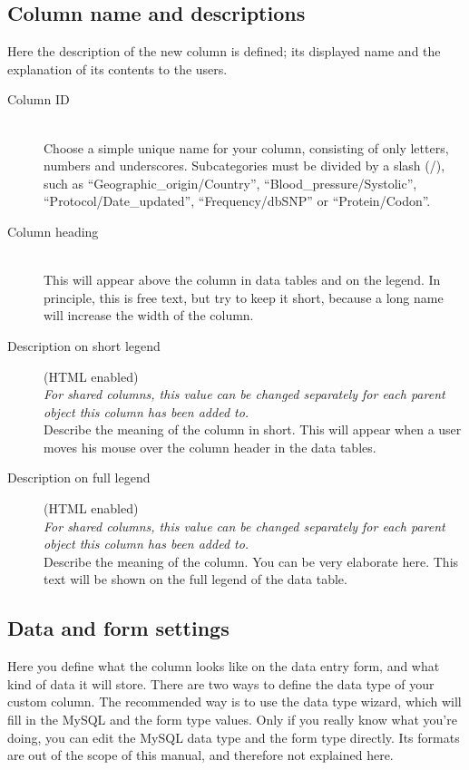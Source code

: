 \subsection{Column name and descriptions}
Here the description of the new column is defined; its displayed name and the explanation of its contents to the users.
\begin{description}
  \item[Column ID] \hfill \\
  Choose a simple unique name for your column, consisting of only letters, numbers and underscores.
  Subcategories must be divided by a slash (/), such as ``Geographic\_origin\slash Country'',
   ``Blood\_pressure/Systolic'', ``Protocol/Date\_updated'', ``Frequency/dbSNP'' or ``Protein/Codon''.
  \item[Column heading] \hfill \\
  This will appear above the column in data tables and on the legend.
  In principle, this is free text, but try to keep it short, because a long name will increase the width of the column.
  \item[Description on short legend] (HTML enabled)\hfill \\
  \emph{For shared columns, this value can be changed separately for each parent object this column has been added to.}
  \\
  Describe the meaning of the column in short.
  This will appear when a user moves his mouse over the column header in the data tables.
  \item[Description on full legend] (HTML enabled)\hfill \\
  \emph{For shared columns, this value can be changed separately for each parent object this column has been added to.}
  \\
  Describe the meaning of the column.
  You can be very elaborate here.
  This text will be shown on the full legend of the data table.
\end{description}



\subsection{Data and form settings}
Here you define what the column looks like on the data entry form, and what kind of data it will store.
There are two ways to define the data type of your custom column.
The recommended way is to use the data type wizard, which will fill in the MySQL and the form type values.
Only if you really know what you're doing, you can edit the MySQL data type and the form type directly.
Its formats are out of the scope of this manual, and therefore not explained here.


